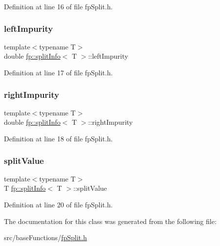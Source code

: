 Definition at line 16 of file fp\+Split.\+h.

\mbox{\label{classfp_1_1splitInfo_a07ad3b8d248d48e3157aa44a2452bc8c}} 
\subsubsection{\texorpdfstring{left\+Impurity}{leftImpurity}}
{\footnotesize\ttfamily template$<$typename T$>$ \\
double \hyperlink{classfp_1_1splitInfo}{fp\+::split\+Info}$<$ T $>$\+::left\+Impurity\hspace{0.3cm}{\ttfamily [protected]}}



Definition at line 17 of file fp\+Split.\+h.

\mbox{\label{classfp_1_1splitInfo_ac70a7dadd873d5bb1535fb0e5bea45fc}} 
\subsubsection{\texorpdfstring{right\+Impurity}{rightImpurity}}
{\footnotesize\ttfamily template$<$typename T$>$ \\
double \hyperlink{classfp_1_1splitInfo}{fp\+::split\+Info}$<$ T $>$\+::right\+Impurity\hspace{0.3cm}{\ttfamily [protected]}}



Definition at line 18 of file fp\+Split.\+h.

\mbox{\label{classfp_1_1splitInfo_a38374c82d5d58eafebb71b7aea024147}} 
\subsubsection{\texorpdfstring{split\+Value}{splitValue}}
{\footnotesize\ttfamily template$<$typename T$>$ \\
T \hyperlink{classfp_1_1splitInfo}{fp\+::split\+Info}$<$ T $>$\+::split\+Value\hspace{0.3cm}{\ttfamily [protected]}}



Definition at line 20 of file fp\+Split.\+h.



The documentation for this class was generated from the following file\+:\begin{DoxyCompactItemize}
\item 
src/base\+Functions/\hyperlink{fpSplit_8h}{fp\+Split.\+h}\end{DoxyCompactItemize}

